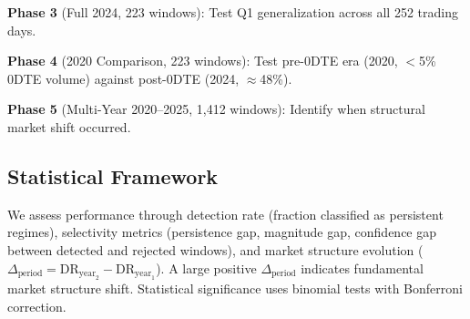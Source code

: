 \textbf{Phase 3} (Full 2024, 223 windows): Test Q1 generalization across all 252 trading days.

\textbf{Phase 4} (2020 Comparison, 223 windows): Test pre-0DTE era (2020, $<$5\% 0DTE volume) against post-0DTE (2024, $\approx$48\%).

\textbf{Phase 5} (Multi-Year 2020--2025, 1,412 windows): Identify when structural market shift occurred.

\subsection{Statistical Framework}

We assess performance through detection rate (fraction classified as persistent regimes), selectivity metrics (persistence gap, magnitude gap, confidence gap between detected and rejected windows), and market structure evolution ($\Delta_{\text{period}} = \text{DR}_{\text{year}_2} - \text{DR}_{\text{year}_1}$). A large positive $\Delta_{\text{period}}$ indicates fundamental market structure shift. Statistical significance uses binomial tests with Bonferroni correction.
